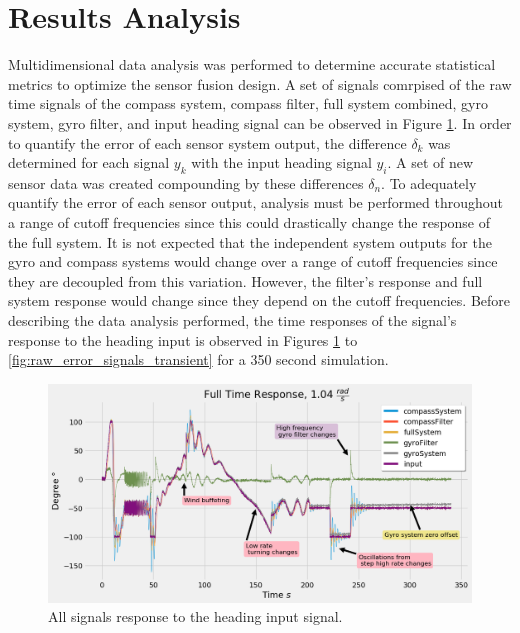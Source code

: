 \section{Results Analysis}

Multidimensional data analysis was performed to determine accurate statistical metrics to optimize the sensor fusion design. A set of signals comrpised of the raw time signals of the compass system, compass filter, full system combined, gyro system, gyro filter, and input heading signal can be observed in Figure \ref{fig:raw_time_signals_full}. In order to quantify the error of each sensor system output, the difference $\delta_k$ was determined for each signal $y_k$ with the input heading signal $y_i$. A set of new sensor data was created compounding by these differences $\delta_n$. To adequately quantify the error of each sensor output, analysis must be performed throughout a range of cutoff frequencies since this could drastically change the response of the full system. It is not expected that the independent system outputs for the gyro and compass systems would change over a range of cutoff frequencies since they are decoupled from this variation. However, the filter's response and full system response would change since they depend on the cutoff frequencies. Before describing the data analysis performed, the time responses of the signal's response to the heading input is observed in Figures \ref{fig:raw_time_signals_full} to \ref{fig:raw_error_signals_transient} for a 350 second simulation.

\begin{figure}[H]
    \centering
    \includegraphics[width=\linewidth]{img/allSignalsFullTimeResponse_1_0476.png}
    \caption{All signals response to the heading input signal.}
    \label{fig:raw_time_signals_full}
\end{figure}

